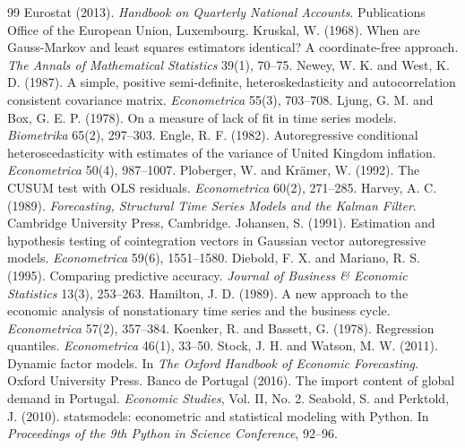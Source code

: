 \documentclass[11pt,a4paper]{article}
\begin{document}
\begin{thebibliography}{99}
 Eurostat (2013). \emph{Handbook on Quarterly National Accounts}. Publications Office of the European Union, Luxembourg.
 Kruskal, W. (1968). When are Gauss-Markov and least squares estimators identical? A coordinate-free approach. \emph{The Annals of Mathematical Statistics} 39(1), 70--75.
 Newey, W. K. and West, K. D. (1987). A simple, positive semi-definite, heteroskedasticity and autocorrelation consistent covariance matrix. \emph{Econometrica} 55(3), 703--708.
 Ljung, G. M. and Box, G. E. P. (1978). On a measure of lack of fit in time series models. \emph{Biometrika} 65(2), 297--303.
 Engle, R. F. (1982). Autoregressive conditional heteroscedasticity with estimates of the variance of United Kingdom inflation. \emph{Econometrica} 50(4), 987--1007.
 Ploberger, W. and Kr\"amer, W. (1992). The CUSUM test with OLS residuals. \emph{Econometrica} 60(2), 271--285.
 Harvey, A. C. (1989). \emph{Forecasting, Structural Time Series Models and the Kalman Filter}. Cambridge University Press, Cambridge.
 Johansen, S. (1991). Estimation and hypothesis testing of cointegration vectors in Gaussian vector autoregressive models. \emph{Econometrica} 59(6), 1551--1580.
 Diebold, F. X. and Mariano, R. S. (1995). Comparing predictive accuracy. \emph{Journal of Business \& Economic Statistics} 13(3), 253--263.
 Hamilton, J. D. (1989). A new approach to the economic analysis of nonstationary time series and the business cycle. \emph{Econometrica} 57(2), 357--384.
 Koenker, R. and Bassett, G. (1978). Regression quantiles. \emph{Econometrica} 46(1), 33--50.
 Stock, J. H. and Watson, M. W. (2011). Dynamic factor models. In \emph{The Oxford Handbook of Economic Forecasting}. Oxford University Press.
 Banco de Portugal (2016). The import content of global demand in Portugal. \emph{Economic Studies}, Vol. II, No. 2.
 Seabold, S. and Perktold, J. (2010). statsmodels: econometric and statistical modeling with Python. In \emph{Proceedings of the 9th Python in Science Conference}, 92--96.
\end{thebibliography}
\end{document}
